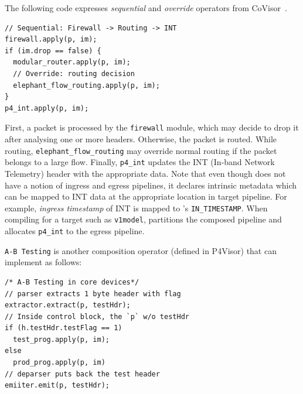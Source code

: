 \documentclass[letterpaper,twocolumn,10pt]{article}
\begin{document}
%
The following \ulang code expresses
\emph{sequential} and \emph{override} operators from
CoVisor~\cite{188954}.
\begin{lstlisting}[frame=none, escapechar=!]
// Sequential: Firewall -> Routing -> INT
firewall.apply(p, im);
if (im.drop == false) {
  modular_router.apply(p, im);
  // Override: routing decision
  elephant_flow_routing.apply(p, im);
}
p4_int.apply(p, im);
\end{lstlisting}
First, a packet is processed by the \texttt{firewall} module, which
may decide to drop it after analysing one or more headers. Otherwise,
the packet is routed. While routing, \texttt{elephant\_flow\_routing}
may override normal routing if the packet belongs to a large flow.
Finally, \texttt{p4\_int} updates the INT (In-band Network Telemetry)
\cite{Kim2015InbandNT, p4int} header with the appropriate data. Note
that even though \uarch does not have a notion of ingress and egress
pipelines, it declares intrinsic metadata which can be mapped to INT
data at the appropriate location in target pipeline. For example,
\emph{ingress timestamp} of INT is mapped to \ulang's
\texttt{IN\_TIMESTAMP}. When compiling for a target such as
\texttt{v1model}, \ucomp partitions the composed pipeline and
allocates \texttt{p4\_int} to the egress pipeline.

\texttt{A-B Testing} is another composition operator (defined in 
P4Visor\cite{Zheng:2018:PLV:3281411.3281436}) that \ulang can 
implement as follows:
\begin{lstlisting}[frame=none, escapechar=!]
/* A-B Testing in core devices*/
// parser extracts 1 byte header with flag
extractor.extract(p, testHdr);
// Inside control block, the `p` w/o testHdr
if (h.testHdr.testFlag == 1)
  test_prog.apply(p, im);
else
  prod_prog.apply(p, im)
// deparser puts back the test header
emiiter.emit(p, testHdr);
\end{lstlisting}
\end{document}
